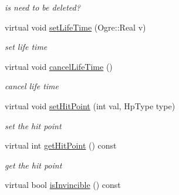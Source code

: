 \begin{DoxyCompactItemize}
\begin{DoxyCompactList}\small\item\em is need to be deleted? \end{DoxyCompactList}\item 
virtual void \hyperlink{class_n_c_t_u_1_1_obstacle_a1e444ec09571654d3a2d18a68d8bb9eb}{set\+Life\+Time} (Ogre\+::\+Real v)\hypertarget{class_n_c_t_u_1_1_obstacle_a1e444ec09571654d3a2d18a68d8bb9eb}{}\label{class_n_c_t_u_1_1_obstacle_a1e444ec09571654d3a2d18a68d8bb9eb}

\begin{DoxyCompactList}\small\item\em set life time \end{DoxyCompactList}\item 
virtual void \hyperlink{class_n_c_t_u_1_1_obstacle_a4300351847149b550c72826721e3d2aa}{cancel\+Life\+Time} ()\hypertarget{class_n_c_t_u_1_1_obstacle_a4300351847149b550c72826721e3d2aa}{}\label{class_n_c_t_u_1_1_obstacle_a4300351847149b550c72826721e3d2aa}

\begin{DoxyCompactList}\small\item\em cancel life time \end{DoxyCompactList}\item 
virtual void \hyperlink{class_n_c_t_u_1_1_obstacle_a41c126bdbf76855a5ba645a5d74024cb}{set\+Hit\+Point} (int val, Hp\+Type type)\hypertarget{class_n_c_t_u_1_1_obstacle_a41c126bdbf76855a5ba645a5d74024cb}{}\label{class_n_c_t_u_1_1_obstacle_a41c126bdbf76855a5ba645a5d74024cb}

\begin{DoxyCompactList}\small\item\em set the hit point \end{DoxyCompactList}\item 
virtual int \hyperlink{class_n_c_t_u_1_1_obstacle_a3e010ae1903baacc5991a6ff677d70f2}{get\+Hit\+Point} () const \hypertarget{class_n_c_t_u_1_1_obstacle_a3e010ae1903baacc5991a6ff677d70f2}{}\label{class_n_c_t_u_1_1_obstacle_a3e010ae1903baacc5991a6ff677d70f2}

\begin{DoxyCompactList}\small\item\em get the hit point \end{DoxyCompactList}\item 
virtual bool \hyperlink{class_n_c_t_u_1_1_obstacle_a65e0fa8a3b943571a7408e7b6242bea1}{is\+Invincible} () const \hypertarget{class_n_c_t_u_1_1_obstacle_a65e0fa8a3b943571a7408e7b6242bea1}{}\label{class_n_c_t_u_1_1_obstacle_a65e0fa8a3b943571a7408e7b6242bea1}


\end{DoxyCompactItemize}
